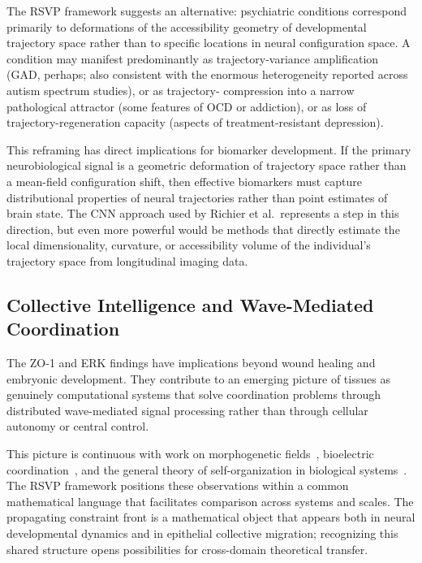 \documentclass[11pt,a4paper]{article}
\theoremstyle{plain}
\theoremstyle{definition}
\begin{document}
The RSVP framework suggests an alternative: psychiatric conditions correspond primarily
to deformations of the accessibility geometry of developmental trajectory space rather
than to specific locations in neural configuration space. A condition may manifest
predominantly as trajectory-variance amplification (GAD, perhaps; also consistent with
the enormous heterogeneity reported across autism spectrum studies), or as trajectory-
compression into a narrow pathological attractor (some features of OCD or addiction),
or as loss of trajectory-regeneration capacity (aspects of treatment-resistant depression).

This reframing has direct implications for biomarker development. If the primary
neurobiological signal is a geometric deformation of trajectory space rather than a
mean-field configuration shift, then effective biomarkers must capture distributional
properties of neural trajectories rather than point estimates of brain state. The CNN
approach used by Richier et al.\ represents a step in this direction, but even more
powerful would be methods that directly estimate the local dimensionality, curvature,
or accessibility volume of the individual's trajectory space from longitudinal imaging data.

\subsection{Collective Intelligence and Wave-Mediated Coordination}

The ZO-1 and ERK findings have implications beyond wound healing and embryonic development.
They contribute to an emerging picture of tissues as genuinely computational systems
that solve coordination problems through distributed wave-mediated signal processing
rather than through cellular autonomy or central control.

This picture is continuous with work on morphogenetic fields~\cite{Levin2012},
bioelectric coordination~\cite{Maturana1980}, and the general theory of self-organization
in biological systems~\cite{Camazine2003}. The RSVP framework positions these
observations within a common mathematical language that facilitates comparison across
systems and scales. The propagating constraint front is a mathematical object that
appears both in neural developmental dynamics and in epithelial collective migration;
recognizing this shared structure opens possibilities for cross-domain theoretical
transfer.
\end{document}
